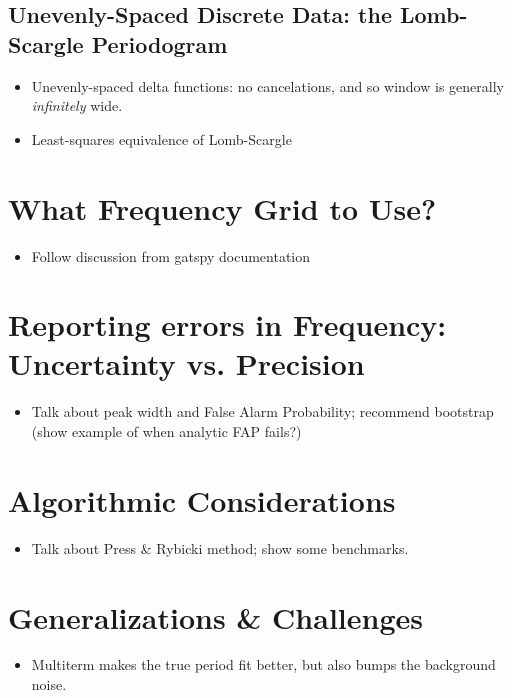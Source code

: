\documentclass[preprint]{aastex}
\begin{document}
\subsection{Unevenly-Spaced Discrete Data: the Lomb-Scargle Periodogram}


\begin{itemize}
\item Unevenly-spaced delta functions: no cancelations, and so window is generally {\it infinitely} wide.
\item Least-squares equivalence of Lomb-Scargle
\end{itemize}

\section{What Frequency Grid to Use?}

\begin{itemize}
\item Follow discussion from gatspy documentation
\end{itemize}

\section{Reporting errors in Frequency: Uncertainty vs. Precision}

\begin{itemize}
\item Talk about peak width and False Alarm Probability; recommend bootstrap (show example of when analytic FAP fails?)
\end{itemize}

\section{Algorithmic Considerations}

\begin{itemize}
\item Talk about Press \& Rybicki method; show some benchmarks.
\end{itemize}

\section{Generalizations \& Challenges}

\begin{itemize}
\item Multiterm makes the true period fit better, but also bumps the background noise.
\end{itemize}

\citet{VanderPlas2015}



\end{document}
